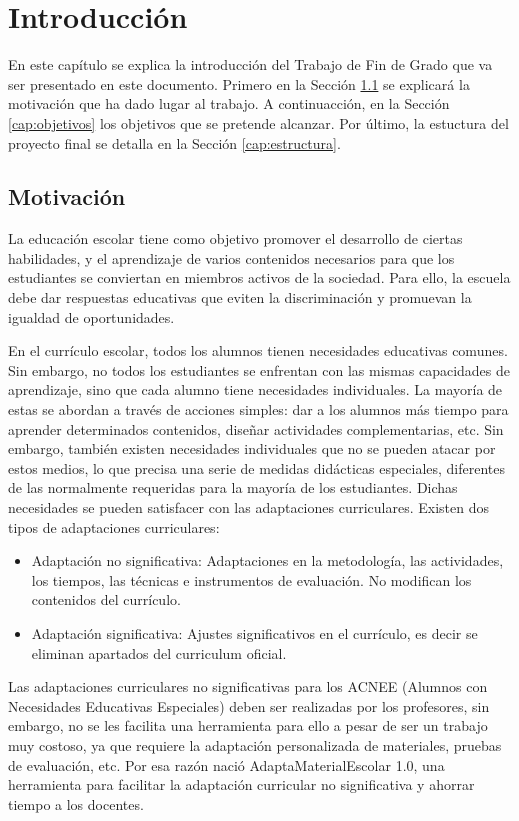 \chapter{Introducción}
\label{ch:introduccion}

En este capítulo se explica la introducción del Trabajo de Fin de Grado que va ser presentado en este documento. Primero en la Sección \ref{cap:motivacio} se explicará la motivación que ha dado lugar al trabajo. A continuacción, en la Sección \ref{cap:objetivos} los objetivos que se pretende alcanzar. Por último, la estuctura del proyecto final se detalla en la Sección \ref{cap:estructura}.

\section{Motivación}\label{cap:motivacio}
La educación escolar tiene como objetivo promover el desarrollo de ciertas habilidades, y el aprendizaje de varios contenidos necesarios para que los estudiantes se conviertan en miembros activos de la sociedad. Para ello, la escuela debe dar respuestas educativas que eviten la discriminación y promuevan la igualdad de oportunidades.

En el currículo escolar, todos los alumnos tienen necesidades educativas comunes. Sin embargo, no todos los estudiantes se enfrentan con las mismas capacidades de aprendizaje, sino que cada alumno tiene necesidades individuales. La mayoría de estas se abordan a través de acciones simples: dar a los alumnos más tiempo para aprender determinados contenidos, diseñar actividades complementarias, etc.  Sin embargo, también existen necesidades individuales que no se pueden atacar por estos medios, lo que precisa una serie de medidas didácticas especiales, diferentes de las normalmente requeridas para la mayoría de los estudiantes. Dichas necesidades se pueden satisfacer con las adaptaciones curriculares. Existen dos tipos de adaptaciones curriculares:
\begin{itemize}
    \item Adaptación no significativa: Adaptaciones en la metodología, las actividades, los tiempos,
    las técnicas e instrumentos de evaluación. No modifican los contenidos del currículo.  
    \item Adaptación significativa: Ajustes significativos en el currículo, es decir se eliminan apartados del curriculum oficial. 
\end{itemize}
Las adaptaciones curriculares no significativas para los ACNEE (Alumnos con Necesidades Educativas Especiales) deben ser realizadas por los profesores, sin embargo, no se les facilita una herramienta para ello a pesar de ser un trabajo muy costoso, ya que requiere la adaptación personalizada de materiales, pruebas de evaluación, etc. Por esa razón nació AdaptaMaterialEscolar 1.0, una herramienta para facilitar la adaptación curricular no significativa y ahorrar tiempo a los docentes.

